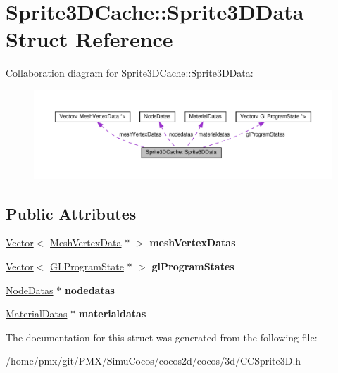 \hypertarget{structSprite3DCache_1_1Sprite3DData}{}\section{Sprite3\+D\+Cache\+:\+:Sprite3\+D\+Data Struct Reference}
\label{structSprite3DCache_1_1Sprite3DData}


Collaboration diagram for Sprite3\+D\+Cache\+:\+:Sprite3\+D\+Data\+:
\nopagebreak
\begin{figure}[H]
\begin{center}
\leavevmode
\includegraphics[width=350pt]{structSprite3DCache_1_1Sprite3DData__coll__graph}
\end{center}
\end{figure}
\subsection*{Public Attributes}
\begin{DoxyCompactItemize}
\item 
\mbox{\label{structSprite3DCache_1_1Sprite3DData_af91810cc54d72ae7e74a5893e8278ea6}} 
\hyperlink{classVector}{Vector}$<$ \hyperlink{classMeshVertexData}{Mesh\+Vertex\+Data} $\ast$ $>$ {\bfseries mesh\+Vertex\+Datas}
\item 
\mbox{\label{structSprite3DCache_1_1Sprite3DData_a65df14a7c285cab0b7bfa232d8e4f831}} 
\hyperlink{classVector}{Vector}$<$ \hyperlink{classGLProgramState}{G\+L\+Program\+State} $\ast$ $>$ {\bfseries gl\+Program\+States}
\item 
\mbox{\label{structSprite3DCache_1_1Sprite3DData_a449d13c6b4e994ca4de496670d59e682}} 
\hyperlink{structNodeDatas}{Node\+Datas} $\ast$ {\bfseries nodedatas}
\item 
\mbox{\label{structSprite3DCache_1_1Sprite3DData_a262b0e59cc866537efb1314b7b81d5a1}} 
\hyperlink{structMaterialDatas}{Material\+Datas} $\ast$ {\bfseries materialdatas}
\end{DoxyCompactItemize}


The documentation for this struct was generated from the following file\+:\begin{DoxyCompactItemize}
\item 
/home/pmx/git/\+P\+M\+X/\+Simu\+Cocos/cocos2d/cocos/3d/C\+C\+Sprite3\+D.\+h\end{DoxyCompactItemize}
